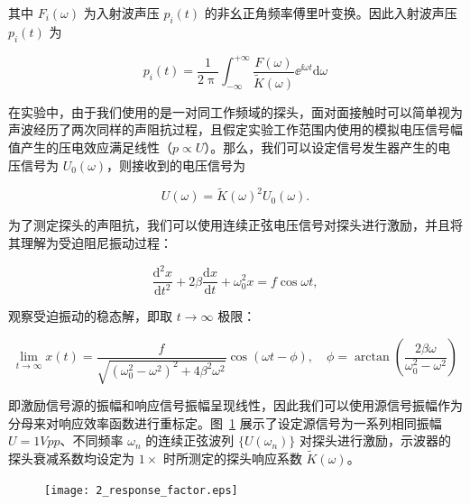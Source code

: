 其中 $F_{i}(\omega)$ 为入射波声压 $p_{i}(t)$ 的非幺正角频率傅里叶变换。因此入射波声压 $p_{i}(t)$ 为

\begin{equation}
  p_{i}(t) = \frac{1}{2\uppi}\int_{-\infty}^{+\infty}\frac{F(\omega)}{\widetilde{K}(\omega)}{\ee}^{\ii\omega t}\mathrm{d}\omega\label{eq:response_correct}
\end{equation}

在实验中，由于我们使用的是一对同工作频域的探头，面对面接触时可以简单视为声波经历了两次同样的声阻抗过程，且假定实验工作范围内使用的模拟电压信号幅值产生的压电效应满足线性（$p\propto U$）。那么，我们可以设定信号发生器产生的电压信号为 $U_{0}(\omega)$，则接收到的电压信号为

\begin{equation}
  U(\omega) = \widetilde{K}(\omega)^{2}U_{0}(\omega).
\end{equation}

为了测定探头的声阻抗，我们可以使用连续正弦电压信号对探头进行激励，并且将其理解为受迫阻尼振动过程：

\begin{equation}
  \frac{\mathrm{d}^{2}x}{\mathrm{d}t^{2}} + 2\beta\frac{\mathrm{d}x}{\mathrm{d}t} + \omega_{0}^{2}x = f\cos{\omega t},
\end{equation}

观察受迫振动的稳态解，即取 $t\rightarrow \infty$ 极限：

\begin{equation}
  \lim_{t\rightarrow \infty} x(t) = \frac{f}{\sqrt{(\omega_{0}^{2} - \omega^{2})^{2} + 4\beta^{2}\omega^{2}}}\cos{(\omega t - \phi)},\quad \phi = \arctan{\left(\frac{2\beta\omega}{\omega_{0}^{2}-\omega^{2}}\right)}
\end{equation}

即激励信号源的振幅和响应信号振幅呈现线性，因此我们可以使用源信号振幅作为分母来对响应效率函数进行重标定。图~\ref{fig:response_factor} 展示了设定源信号为一系列相同振幅 $U = 1\unit{Vpp}$、不同频率 $\omega_{n}$ 的连续正弦波列 $\{U(\omega_{n})\}$ 对探头进行激励，示波器的探头衰减系数均设定为 $1\times $ 时所测定的探头响应系数 $\widetilde{K}(\omega)$。

\begin{figure}[!htp]
  \centering
  \texttt{[image: 2\_response\_factor.eps]}
  \label{fig:response_factor}
\end{figure}

